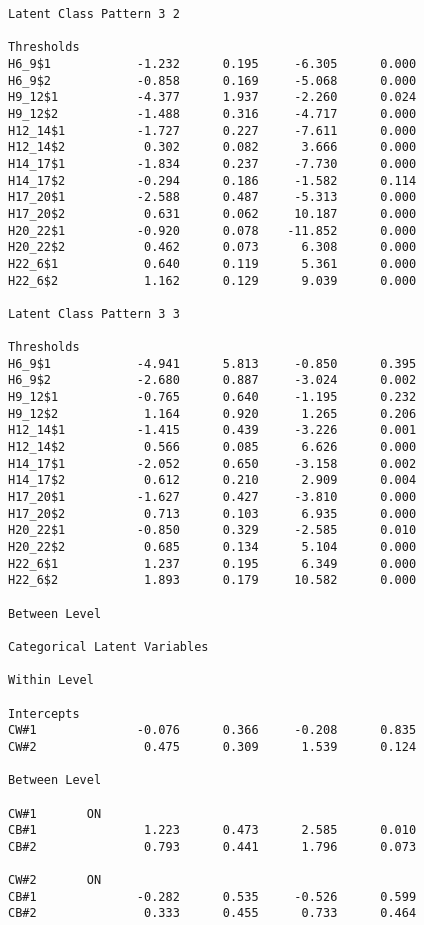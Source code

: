 \begin{verbatim}
Latent Class Pattern 3 2

Thresholds
H6_9$1            -1.232      0.195     -6.305      0.000
H6_9$2            -0.858      0.169     -5.068      0.000
H9_12$1           -4.377      1.937     -2.260      0.024
H9_12$2           -1.488      0.316     -4.717      0.000
H12_14$1          -1.727      0.227     -7.611      0.000
H12_14$2           0.302      0.082      3.666      0.000
H14_17$1          -1.834      0.237     -7.730      0.000
H14_17$2          -0.294      0.186     -1.582      0.114
H17_20$1          -2.588      0.487     -5.313      0.000
H17_20$2           0.631      0.062     10.187      0.000
H20_22$1          -0.920      0.078    -11.852      0.000
H20_22$2           0.462      0.073      6.308      0.000
H22_6$1            0.640      0.119      5.361      0.000
H22_6$2            1.162      0.129      9.039      0.000

Latent Class Pattern 3 3

Thresholds
H6_9$1            -4.941      5.813     -0.850      0.395
H6_9$2            -2.680      0.887     -3.024      0.002
H9_12$1           -0.765      0.640     -1.195      0.232
H9_12$2            1.164      0.920      1.265      0.206
H12_14$1          -1.415      0.439     -3.226      0.001
H12_14$2           0.566      0.085      6.626      0.000
H14_17$1          -2.052      0.650     -3.158      0.002
H14_17$2           0.612      0.210      2.909      0.004
H17_20$1          -1.627      0.427     -3.810      0.000
H17_20$2           0.713      0.103      6.935      0.000
H20_22$1          -0.850      0.329     -2.585      0.010
H20_22$2           0.685      0.134      5.104      0.000
H22_6$1            1.237      0.195      6.349      0.000
H22_6$2            1.893      0.179     10.582      0.000

Between Level

Categorical Latent Variables

Within Level

Intercepts
CW#1              -0.076      0.366     -0.208      0.835
CW#2               0.475      0.309      1.539      0.124

Between Level

CW#1       ON
CB#1               1.223      0.473      2.585      0.010
CB#2               0.793      0.441      1.796      0.073

CW#2       ON
CB#1              -0.282      0.535     -0.526      0.599
CB#2               0.333      0.455      0.733      0.464


\end{verbatim}
